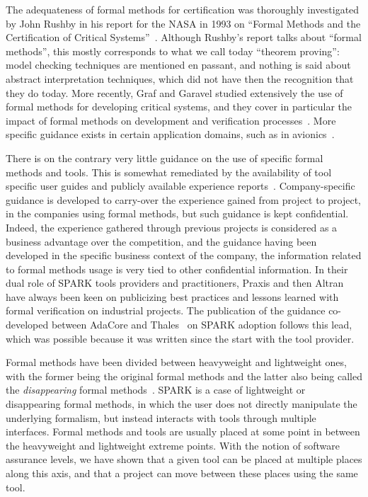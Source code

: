 \documentclass{llncs}
\begin{document}
The adequateness of formal methods for certification was thoroughly
investigated by John Rushby in his report for the NASA in 1993 on ``Formal
Methods and the Certification of Critical
Systems''~\cite{Rushby93formalmethods}. Although Rushby's report talks about
``formal methods'', this mostly corresponds to what we call today ``theorem
proving'': model checking techniques are mentioned en passant, and nothing is
said about abstract interpretation techniques, which did not have then the
recognition that they do today. More recently, Graf and Garavel studied
extensively the use of formal methods for developing critical systems, and they
cover in particular the impact of formal methods on development and
verification processes~\cite{GrafGaravel-BSI-2013}. More specific guidance
exists in certain application domains, such as in
avionics~\cite{BrownERTS2010}.

There is on the contrary very little guidance on the use of specific formal
methods and tools. This is somewhat remediated by the availability of tool
specific user guides and publicly available experience
reports~\cite{Woodcock2009}. Company-specific guidance is developed to
carry-over the experience gained from project to project, in the companies
using formal methods, but such guidance is kept confidential. Indeed, the
experience gathered through previous projects is considered as a business
advantage over the competition, and the guidance having been developed in the
specific business context of the company, the information related to formal
methods usage is very tied to other confidential information. In their dual
role of SPARK tools providers and practitioners, Praxis and then Altran have
always been keen on publicizing best practices and lessons learned with formal
verification on industrial projects. The publication of the guidance
co-developed between AdaCore and Thales~\cite{AdaCoreThalesSPARK} on SPARK
adoption follows this lead, which was possible because it was written since the
start with the tool provider.

Formal methods have been divided between heavyweight and lightweight ones, with
the former being the original formal methods and the latter also being called
the \textit{disappearing} formal methods~\cite{hase00}. SPARK is a case of
lightweight or disappearing formal methods, in which the user does not directly
manipulate the underlying formalism, but instead interacts with tools through
multiple interfaces. Formal methods and tools are usually placed at some point
in between the heavyweight and lightweight extreme points. With the notion of
software assurance levels, we have shown that a given tool can be placed at
multiple places along this axis, and that a project can move between these
places using the same tool.
\end{document}
